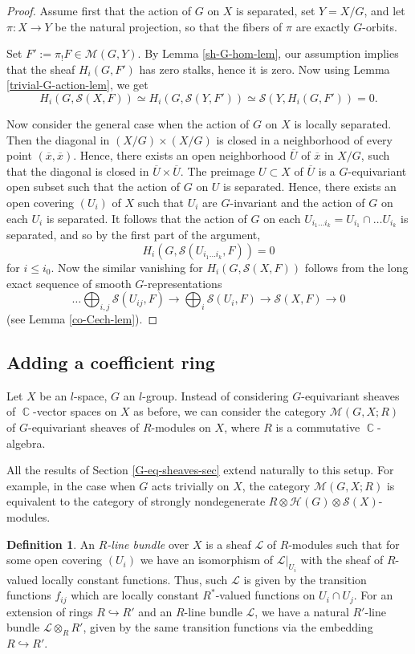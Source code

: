 \documentclass[12pt,reqno]{amsart}
\DeclareMathOperator\C{\mathbb C}
\theoremstyle{definition}
\newtheorem{definition}[theorem]{Definition}
\theoremstyle{remark}
\numberwithin{equation}{section}
\newcommand{\hra}{\hookrightarrow}
\newcommand{\ot}{\otimes}
\renewcommand{\SS}{{\mathcal S}}
\newcommand{\HH}{{\mathcal H}}
\newcommand{\LL}{{\mathcal L}}
\newcommand{\MM}{{\mathcal M}}
\newcommand{\sub}{\subset}
\newcommand{\ov}{\overline}
\begin{document}
\begin{proof} Assume first that the action of $G$ on $X$ is separated, set $Y=X/G$, and let $\pi:X\to Y$ be the natural projection,
so that the fibers of $\pi$ are exactly $G$-orbits.

Set $F':=\pi_!F\in \MM(G,Y)$.
By Lemma \ref{sh-G-hom-lem}, our assumption implies that the sheaf $H_i(G,F')$ has zero stalks, hence
it is zero. Now using Lemma \ref{trivial-G-action-lem}, we get
$$H_i(G,\SS(X,F))\simeq H_i(G,\SS(Y,F'))\simeq \SS(Y,H_i(G,F'))=0.$$

Now consider the general case when the action of $G$ on $X$ is locally separated. Then 
the diagonal in $(X/G)\times(X/G)$ is closed in a neighborhood of every point $(\ov{x},\ov{x})$. Hence, there exists an open neighborhood
$\ov{U}$ of $\ov{x}$ in $X/G$, such that the diagonal is closed in $\ov{U}\times \ov{U}$. The preimage $U\sub X$ of $\ov{U}$ is a $G$-equivariant
open subset such that the action of $G$ on $U$ is separated.
Hence, there exists an open covering $(U_i)$ of $X$ such that $U_i$ are $G$-invariant and the action of $G$ on each $U_i$ is separated.
It follows that the action of $G$ on each $U_{i_1\ldots i_k}=U_{i_1}\cap\ldots U_{i_k}$ is separated, and so by the first part of the argument,
$$H_i(G,\SS(U_{i_1\ldots i_k},F))=0$$
for $i\le i_0$. Now the similar vanishing for $H_i(G,\SS(X,F))$ follows from the long exact sequence of smooth $G$-representations
$$\ldots \bigoplus_{i,j} \SS(U_{ij},F)\to \bigoplus_i \SS(U_i,F)\to \SS(X,F)\to 0$$
(see Lemma \ref{co-Cech-lem}).
\end{proof}

\subsection{Adding a coefficient ring}\label{sh-coef-sec}

Let $X$ be an $l$-space, $G$ an $l$-group.
Instead of considering $G$-equivariant sheaves of $\C$-vector spaces on $X$ as before, we can consider
the category $\MM(G,X;R)$ of $G$-equivariant sheaves of $R$-modules on $X$, where $R$ is a commutative $\C$-algebra.

All the results of Section \ref{G-eq-sheaves-sec} extend naturally to this setup.
For example, in the case when $G$ acts trivially on $X$, the category $\MM(G,X;R)$ is equivalent to the category of strongly nondegenerate
$R\ot\HH(G)\ot\SS(X)$-modules.

\begin{definition}
An {\it $R$-line bundle} over $X$ is a sheaf $\LL$ of $R$-modules such that for some open covering $(U_i)$ we have
an isomorphism of $\LL|_{U_i}$ with the sheaf of $R$-valued locally constant functions.
Thus, such $\LL$ is given by the transition functions $f_{ij}$ which are locally constant $R^*$-valued functions on $U_i\cap U_j$.
For an extension of rings $R\hra R'$ and an $R$-line bundle $\LL$, we have a natural $R'$-line bundle $\LL\ot_R R'$, given by
the same transition functions via the embedding $R\hra R'$.
\end{definition}
\end{document}
